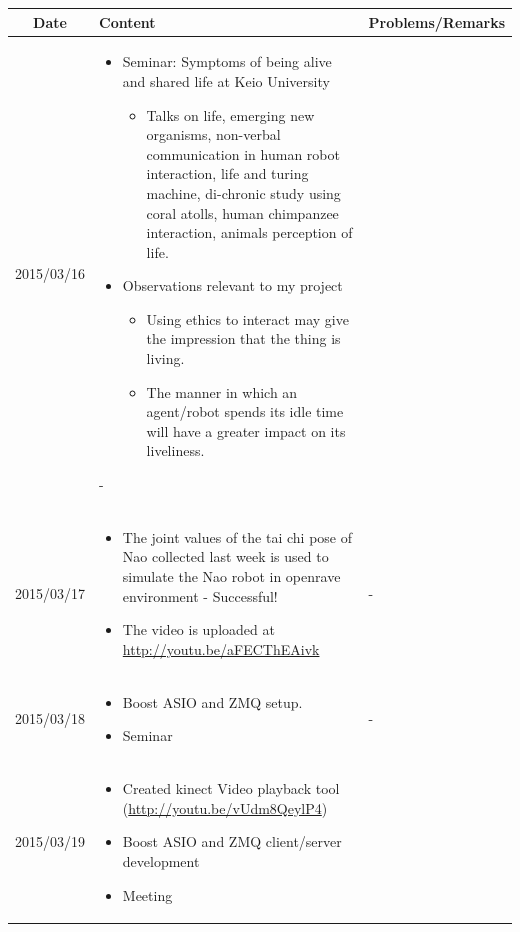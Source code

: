 \documentclass[11pt]{article} %
\begin{document}
\begin{center}
    \begin{longtable}{ | c | p{6cm} | p{5cm} |}
    \hline
    Date & Content & Problems/Remarks \\ 
    \endhead
    \hline    
     2015/03/16         & 
  \begin{itemize}
  \item Seminar: Symptoms of being alive and shared life at Keio University
  \begin{itemize}
	\item Talks on life, emerging new organisms, non-verbal communication in human robot interaction, life and turing machine, di-chronic study using coral atolls, human chimpanzee interaction, animals perception of life.	  
  \end{itemize}
  \item Observations relevant to my project
  \begin{itemize}
  	\item Using ethics to interact may give the impression that the thing is living. 
	\item The manner in which an agent/robot spends its idle time will have a greater impact on its liveliness.
  \end{itemize}
\end{itemize}  
- \\
\hline
  										 
 2015/03/17         & 
  \begin{itemize}
  \item The joint values of the tai chi pose of Nao collected last week is used to simulate the Nao robot in openrave environment - Successful!
  \item The video is uploaded at \url{http://youtu.be/aFECThEAivk}
\end{itemize}   
& 
  -  \\
\hline
  										 
  
  2015/03/18        & 
  \begin{itemize}
  \item Boost ASIO and ZMQ setup.
  \item Seminar
\end{itemize}   
  										 & - \\
  \hline
  
  2015/03/19         & 
  \begin{itemize}
  \item Created kinect Video playback tool (\url{http://youtu.be/vUdm8QeylP4})
  \item Boost ASIO and ZMQ client/server development
  \item Meeting
\end{itemize}   
  & 
\\  										 \hline


\end{longtable}
\end{center}
\end{document}
